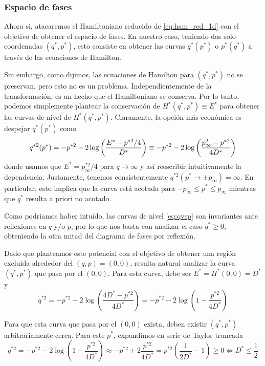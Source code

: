 \subsubsection{Espacio de fases}{\label{sec:teo_fases}}

Ahora si, atacaremos el Hamiltoniano reducido de \eqref{eq:ham_red_1d} con el objetivo de obtener el espacio de fases.
En nuestro caso, teniendo dos solo coordenadas $(q^*,p^*)$, esto consiste en obtener las curvas $q^*(p^*)$ o $p^*(q^*)$ a través de las ecuaciones de Hamilton.

Sin embargo, como dijimos, las ecuaciones de Hamilton para $(q^*,p^*)$ no se preservan, pero esto no es un problema.
Independientemente de la transformación, es un hecho que el Hamiltoniano se conserva.
Por lo tanto, podemos simplemente plantear la conservación de $H^*(q^*,p^*)\equiv E^*$ para obtener las curvas de nivel de $H^*(q^*,p^*)$.
Claramente, la opción más económica es despejar $q^*(p^*)$ como
\begin{equation}{\label{eq:qvsp}}
q^{*2}(p^*) = -p^{*2} - 2 \log\left( \frac{E^*-p^{*2}/4}{D^*} \right) \equiv -p^{*2} - 2 \log\left( \frac{p_\infty^2-p^{*2}}{4D^*} \right)
\end{equation}
donde usamos que $E^* = p_\infty^{*2}/4$ para $q\to\infty$ y así reescribir intuitivamente la dependencia.
Justamente, tenemos consistentemente $q^{*2}(p^*\to\pm p_\infty) = \infty$.
En particular, esto implica que la curva está acotada para $-p_\infty \leq p^* \leq p_\infty$ mientras que $q^*$ resulta a priori no acotado.

Como podriamos haber intuído, las curvas de nivel \eqref{eq:qvsp} son invariantes ante reflexiones en $q$ y/o $p$, por lo que nos basta con analizar el caso $q^*\geq 0$, obteniendo la otra mitad del diagrama de fases por reflexión.

Dado que planteamos este potencial con el objetivo de obtener una región excluida alrededor del $(q,p)=(0,0)$, resulta natural analizar la curva $(q^*,p^*)$ que pasa por el $(0,0)$.
Para esta curva, debe ser $E^* = H^*(0,0) = D^*$ y
\[ q^{*2} = -p^{*2} - 2\log\left( \frac{4D^*-p^{*2}}{4D^*} \right)
= -p^{*2} - 2\log\left( 1-\frac{p^{*2}}{4D^*} \right) \]

Para que esta curva que pasa por el $(0,0)$ exista, deben existir $(q^*, p^*)$ arbitrariamente cerca.
Para este $p^*$, expandimos en serie de Taylor truncada
\[ q^{*2} = -p^{*2} - 2\log\left( 1-\frac{p^{*2}}{4D^*} \right) \approx -p^{*2} + 2\frac{p^{*2}}{4D^*}  = p^{*2} \left( \frac{1}{2D^*} -1 \right) \geq 0 \Longleftrightarrow D^* \leq \frac{1}{2} \]

